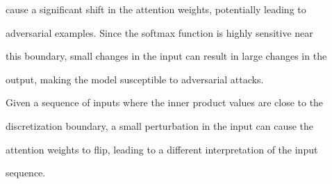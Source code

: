 cause a significant shift in the attention weights, potentially leading to






adversarial examples. Since the softmax function is highly sensitive near






this boundary, small changes in the input can result in large changes in the






output, making the model susceptible to adversarial attacks.













\begin{theorem}






Given a sequence of inputs where the inner product values are close to the






discretization boundary, a small perturbation in the input can cause the






attention weights to flip, leading to a different interpretation of the input






sequence.






\end{theorem}













